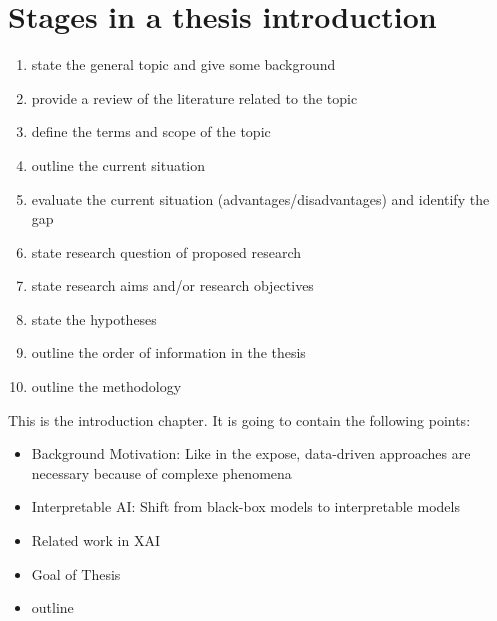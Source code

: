 \documentclass[10pt,a4paper]{article}
\begin{document}
\section{Stages in a thesis introduction}

\begin{enumerate}
	\color{OliveGreen}
	\item state the general topic and give some background
	\item provide a review of the literature related to the topic
	\item define the terms and scope of the topic
	\color{Red}
	\item outline the current situation
	\item evaluate the current situation (advantages/disadvantages) and identify the gap
	\color{Mahogany}
	\item state research question of proposed research
	\item state research aims and/or research objectives
	\item state the hypotheses
	\item outline the order of information in the thesis
	\item outline the methodology
	
\end{enumerate}






This is the introduction chapter. It is going to contain the following points:

\begin{itemize}
	\item Background Motivation: Like in the expose, data-driven approaches are necessary because of complexe phenomena
	\item Interpretable AI: Shift from black-box models to interpretable models
	\item Related work in XAI
	\item Goal of Thesis
	\item outline
\end{itemize}
	
\printbibliography
	
\end{document}
